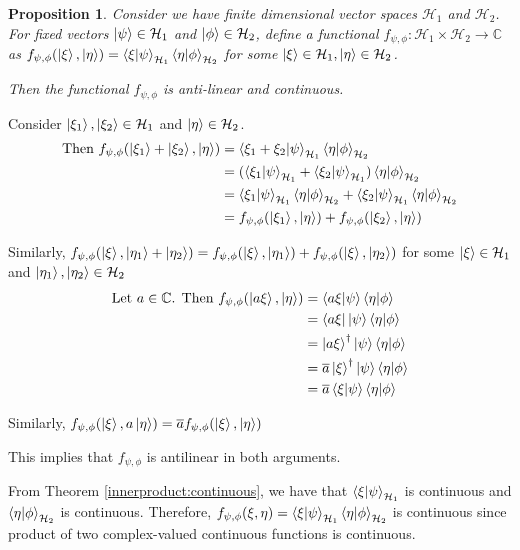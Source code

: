 \documentclass[12pt,twoside,fleqn]{report}
\makeatletter
\theoremstyle{thmstyle}
\renewenvironment{proof}[1][\proofname]{\par
\pushQED{\qed}%
\normalfont \topsep6\p@\@plus6\p@\relax
\trivlist
\item[\hskip\labelsep\itshape#1\@addpunct{.}]\mbox{}\par\nobreak\ignorespaces
}{%
    \popQED\endtrivlist\@endpefalse
    }
\newtheorem{prop}{Proposition}[chapter]
\makeatother
\begin{document}
\begin{prop}
    Consider we have finite dimensional vector spaces $\mathcal{H}_1$ and $\mathcal{H}_2$. For fixed vectors $\ket{\psi} \in \mathcal{H}_1$ and $\ket{\phi} \in \mathcal{H}_2$, define a functional $f_{\psi,\phi}: \mathcal{H}_1 \times \mathcal{H}_2 \to \mathbb{C}$ as $f_{\psi,\phi}(\ket\xi, \ket\eta) = \braket{\xi|\psi}_{\mathcal{H}_1} \braket{\eta | \phi}_{\mathcal{H}_2}$ for some $\ket{\xi} \in \mathcal{H}_1, \ket{\eta} \in \mathcal{H}_2$.

    Then the functional $f_{\psi,\phi}$ is anti-linear and continuous.
\end{prop}
\begin{proof}

    Consider $\ket{\xi_1}, \ket{\xi_2} \in \mathcal{H}_1$ and $\ket{\eta} \in \mathcal{H}_2$. 
    \begin{align*}
        \text{Then }f_{\psi,\phi}(\ket{\xi_1} + \ket{\xi_2}, \ket{\eta}) & = \braket{\xi_1 + \xi_2 | \psi}_{\mathcal{H}_1} \braket{\eta | \phi}_{\mathcal{H}_2} 
        \\ & = (\braket{\xi_1 | \psi}_{\mathcal{H}_1}+ \braket{\xi_2 | \psi}_{\mathcal{H}_1}) \braket{\eta|\phi}_{\mathcal{H}_2}
        \\ & = \braket{\xi_1| \psi}_{\mathcal{H}_1}\braket{\eta|\phi}_{\mathcal{H}_2} + \braket{\xi_2|\psi}_{\mathcal{H}_1}\braket{\eta|\phi}_{\mathcal{H}_2}
        \\ & = f_{\psi,\phi}(\ket{\xi_1}, \ket{\eta}) + f_{\psi,\phi}(\ket{\xi_2},\ket{\eta})
    \end{align*}

    Similarly, $f_{\psi,\phi}(\ket\xi, \ket{\eta_1} + \ket{\eta_2}) = f_{\psi,\phi}(\ket\xi, \ket{\eta_1}) + f_{\psi,\phi}(\ket\xi , \ket{\eta_2})$ 
    for some $\ket\xi \in \mathcal{H}_1$ and $\ket{\eta_1}, \ket{\eta_2}  \in \mathcal{H}_2$
    \begin{align*}
    \text{Let } a \in \mathbb{C}\text{. Then }f_{\psi,\phi}(\ket{a \xi},\ket{\eta}) & = \braket{a \xi|\psi}\braket{\eta|\phi} 
        \\ & = \bra{a \xi}\ket{\psi}\braket{\eta|\phi}
        \\ & = \ket{a \xi}^\dagger \ket{\psi} \braket{\eta|\phi}
        \\ & = \overline{a} \ket{\xi}^\dagger \ket{\psi} \braket{\eta|\phi}
        \\ & = \overline{a} \braket{\xi|\psi} \braket{\eta|\phi}
    \end{align*}

    Similarly, $f_{\psi,\phi}(\ket\xi, a \ket\eta) = \overline{a}f_{\psi,\phi}(\ket\xi, \ket\eta)$

    This implies that $f_{\psi,\phi}$ is antilinear in both arguments.

    \vspace{0.5cm}
    From Theorem \ref{innerproduct:continuous}, we have that $\braket{\xi|\psi}_{\mathcal{H}_1}$ is continuous and $\braket{\eta|\phi}_{\mathcal{H}_2}$ is continuous. Therefore, $f_{\psi,\phi}(\xi, \eta) =  \braket{\xi|\psi}_{\mathcal{H}_1} \braket{\eta | \phi}_{\mathcal{H}_2}$ is continuous since product of two complex-valued continuous functions is continuous.
\end{proof}
\end{document}
